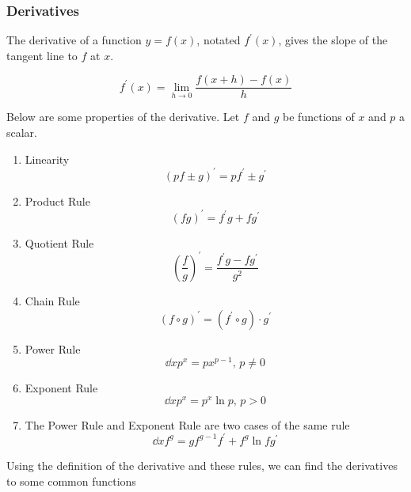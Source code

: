 \subsubsection{Derivatives}
The derivative of a function $y = f(x)$, notated $f^\prime(x)$, gives the slope of the tangent line to $f$ at $x$.
\begin{definition}
	\begin{equation*}
		f^\prime(x) = \lim\limits_{h \to 0}{\frac{f(x+h) - f(x)}{h}}
	\end{equation*}
\end{definition}

\noindent
Below are some properties of the derivative. Let $f$ and $g$ be functions of $x$ and $p$ a scalar.
\begin{enumerate}[label=]
	\item Linearity
	\begin{equation*}
	\left( pf \pm g \right)^\prime = pf^\prime \pm g^\prime
	\end{equation*}
	\item Product Rule
	\begin{equation*}
	\left( fg \right)^\prime = f^\prime g + f g^\prime
	\end{equation*}
	\item Quotient Rule
	\begin{equation*}
	\left( \frac{f}{g} \right)^\prime = \frac{f^\prime g - f g^\prime}{g^2}
	\end{equation*}
	\item Chain Rule
	\begin{equation*}
	\left( f \circ g \right)^\prime = \left( f^\prime \circ g \right) \cdot g^\prime
	\end{equation*}
	\item Power Rule
	\begin{equation*}
	\dd{x} p^x = px^{p-1} \text{, } p \neq 0
	\end{equation*}
	\item Exponent Rule
	\begin{equation*}
	\dd{x} p^x = p^x \ln{p} \text{, } p > 0
	\end{equation*}
	\item The Power Rule and Exponent Rule are two cases of the same rule
	\begin{equation*}
	\dd{x} f^g = gf^{g-1}f^\prime + f^g\ln{f}g^\prime
	\end{equation*}
\end{enumerate}
Using the definition of the derivative and these rules, we can find the derivatives to some common functions
